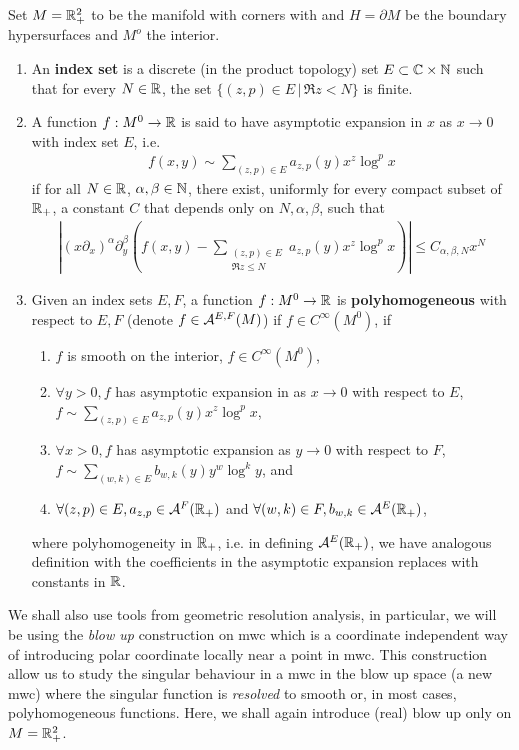 \documentclass{article}
\begin{document}
\begin{definition} \cite{grieser_scales_blow_up}
Set $M = \mathbb R_+^2$ to be the manifold with corners with and $H = \partial M$ be the boundary hypersurfaces and $M^o$ the interior. 
\begin{enumerate}
\item An \textbf{index set} is a discrete (in the product topology) set $E \subset \mathbb C \times \mathbb N$ such that for every $N \in \mathbb R$, the set $\{(z, p) \in E \, |\, \Re z < N\}$ is finite. 
\item A function $f: M^0 \to \mathbb R$ is said to have asymptotic expansion in $x$ as $x \to 0$ with index set $E$, i.e. 
\begin{align*}
f(x, y) \sim \sum_{(z, p) \in E} a_{z, p}(y) x^z \log^p x
\end{align*}
if for all $N \in \mathbb R$, $\alpha, \beta \in \mathbb N$, there exist, uniformly for every compact subset of $\mathbb R_+$, a constant $C$ that depends only on $N, \alpha, \beta$, such that 
\begin{align*}
\left | (x\partial_x)^\alpha \partial_y^\beta \left( f(x, y) -  \sum_{\substack{(z, p) \in E \\ \Re z \leq N}} a_{z, p}(y) x^z \log^p x \right ) \right | \leq C_{\alpha, \beta, N} x^N
\end{align*}
\item Given an index sets $E, F$, a function $f: M^0 \to \mathbb R$ is \textbf{polyhomogeneous} with respect to $E, F$ (denote $f \in {\cal A}^{E, F}(M)$) if $f \in C^\infty(M^0)$, if 
\begin{enumerate}
\item $f$ is smooth on the interior, $f \in C^\infty(M^0)$, 
\item $\forall y > 0, f$ has asymptotic expansion in as $x \to 0$ with respect to $E$, $f \sim \sum_{(z, p) \in E} a_{z, p}(y) x^z \log^p x$, 
\item $\forall x > 0, f$ has asymptotic expansion as $y \to 0$ with respect to $F$, $f \sim \sum_{(w, k) \in E} b_{w, k}(y) y^w \log^k y$, and
\item $\forall (z, p) \in E, a_{z, p} \in {\cal A}^F(\mathbb R_+)$ and $\forall (w, k) \in F, b_{w, k} \in {\cal A}^E(\mathbb R_+)$,
\end{enumerate}
where polyhomogeneity in $\mathbb R_+$, i.e. in defining ${\cal A}^E(\mathbb R_+)$, we have analogous definition with the coefficients in the asymptotic expansion replaces with constants in $\mathbb R$. 
\end{enumerate}
\end{definition}
We shall also use tools from geometric resolution analysis, in particular, we will be using the \emph{blow up} construction on mwc which is a coordinate independent way of introducing polar coordinate locally near a point in mwc. This construction allow us to study the singular behaviour in a mwc in the blow up space (a new mwc) where the singular function is \emph{resolved} to smooth or, in most cases, polyhomogeneous functions. Here, we shall again introduce (real) blow up only on $M = \R^2_+$. 
\begin{definition}[Real blow up for $M = \R^2_+$] 

\end{definition}
\end{document}

